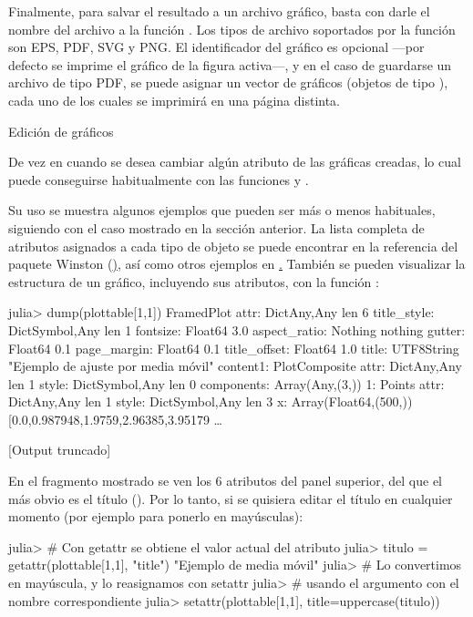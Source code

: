 ﻿\documentclass[spanish]{article}
\begin{document}
Finalmente, para salvar el resultado a un archivo gráfico,
basta con darle el nombre del archivo a la función .
Los tipos de archivo soportados por la función son
EPS, PDF, SVG y PNG. El identificador del gráfico es opcional ---por defecto
se imprime el gráfico de la figura activa---, y en el caso de guardarse un
archivo de tipo PDF, se puede asignar un vector de gráficos (objetos de tipo
), cada uno de los cuales se imprimirá en una página
distinta.

Edición de gráficos

De vez en cuando se desea cambiar algún atributo de las gráficas creadas,
lo cual puede conseguirse habitualmente con las funciones 
y .

Su uso se muestra algunos ejemplos que pueden ser más o menos habituales,
siguiendo con el caso mostrado en la sección anterior. La lista completa
de atributos asignados a cada tipo de objeto se puede encontrar en la
referencia del paquete Winston (\href{https://github.com/nolta/Winston.jl/wiki/Reference}),
así como otros ejemplos en \href{http://winston.readthedocs.org/}.
También se pueden visualizar la estructura de un gráfico, incluyendo sus
atributos, con la función :

julia> dump(plottable[1,1])
FramedPlot 
  attr: Dict{Any,Any} len 6
    title_style: Dict{Symbol,Any} len 1
      fontsize: Float64 3.0
    aspect_ratio: Nothing nothing
    gutter: Float64 0.1
    page_margin: Float64 0.1
    title_offset: Float64 1.0
    title: UTF8String "Ejemplo de ajuste por media móvil"
  content1: PlotComposite 
    attr: Dict{Any,Any} len 1
      style: Dict{Symbol,Any} len 0
    components: Array(Any,(3,))
      1: Points 
        attr: Dict{Any,Any} len 1
          style: Dict{Symbol,Any} len 3
        x: Array(Float64,(500,)) [0.0,0.987948,1.9759,2.96385,3.95179 …  

[Output truncado]

En el fragmento mostrado se ven los 6 atributos del panel superior,
del que el más obvio es el título ().
Por lo tanto, si se quisiera editar el título en cualquier
momento (por ejemplo para ponerlo en mayúsculas):

julia> # Con getattr se obtiene el valor actual del atributo
julia> titulo = getattr(plottable[1,1], "title")
"Ejemplo de media móvil"
julia> # Lo convertimos en mayúscula, y lo reasignamos con setattr
julia> # usando el argumento con el nombre correspondiente
julia> setattr(plottable[1,1], title=uppercase(titulo))
\end{document}
